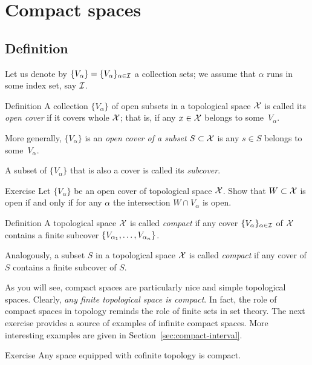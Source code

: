 \chapter{Compact spaces}

\section{Definition}

Let us denote by $\{V_\alpha\}=\{V_\alpha\}_{\alpha\in \mathcal{I}}$ a collection sets;
we assume that $\alpha$ runs in some index set, say $\mathcal{I}$.

\begin{thm}{Definition}
A collection $\{V_\alpha\}$ of open subsets in a topological space $\mathcal{X}$ is called its \emph{open cover} if it covers whole $\mathcal{X}$;
that is, if any $x\in \mathcal{X}$ belongs to some~$V_\alpha$.

More generally, $\{V_\alpha\}$ is an \emph{open cover of a subset} $S\subset \mathcal{X}$ is any $s\in S$ belongs to some~$V_\alpha$.

A subset of $\{V_\alpha\}$ that is also a cover is called its \emph{subcover}.
\end{thm}

\begin{thm}{Exercise}
Let $\{V_\alpha\}$ be an open cover of topological space $\mathcal{X}$.
Show that $W\subset \mathcal{X}$ is open if and only if for any $\alpha$ the intersection $W\cap V_\alpha$ is open.  
\end{thm}

\begin{thm}{Definition}
A topological space $\mathcal{X}$ is called \emph{compact} if any cover $\{V_\alpha\}_{\alpha\in\mathcal{I}}$ of $\mathcal{X}$
contains a finite subcover $\{V_{\alpha_1},\z\dots,V_{\alpha_n}\}$.

Analogously, a subset $S$ in a topological space $\mathcal{X}$ is called \emph{compact} if any cover of $S$
contains a finite subcover of $S$.
\end{thm}

As you will see, compact spaces are particularly nice and simple topological spaces.
Clearly, \textit{any finite topological space is compact}.
In fact, the role of compact spaces in topology reminds the role of finite sets in set theory.
The next exercise provides a source of examples of infinite compact spaces.
More interesting examples are given in Section~\ref{sec:compact-interval}.

\begin{thm}{Exercise}
Any space equipped with cofinite topology is compact. 
\end{thm}

